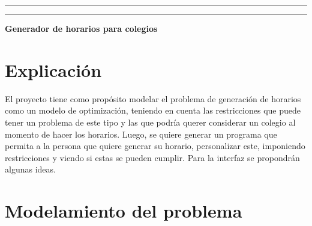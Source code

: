 \documentclass[letterpaper]{article}
\begin{document}
\hfill
\vspace{0pt}
\hfill
\vspace*{6cm}
\begin{center}{}
\vspace*{2mm}
\vspace*{4mm}
\hrule\vspace*{1pt}\hrule
\vspace*{4mm}
{\LARGE\bf Generador de horarios para colegios\\}
\vspace*{4mm}
\vspace*{1mm}
\end{center}

\vspace*{50mm}

\newpage

\tableofcontents

\newpage

\section{Explicación}
El proyecto tiene como propósito modelar el problema de generación de horarios como un modelo de optimización, teniendo en cuenta las restricciones que puede tener un problema de este tipo y las que podría querer considerar un colegio al momento de hacer los horarios. Luego, se quiere generar un programa que permita a la persona que quiere generar su horario, personalizar este, imponiendo restricciones y viendo si estas se pueden cumplir. Para la interfaz se propondrán algunas ideas.

\section{Modelamiento del problema}
\end{document}
